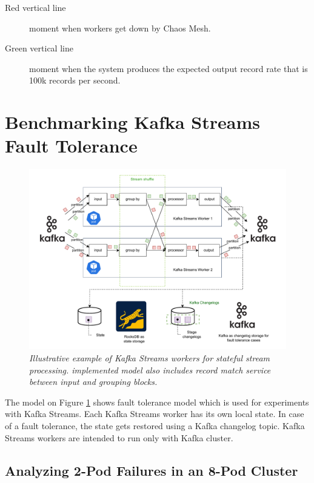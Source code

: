 \begin{description}
    \item[Red vertical line] moment when workers get down by Chaos Mesh.
    \item[Green vertical line] moment when the system produces the expected output record rate that is
    100k records per second.
\end{description}


\section{Benchmarking Kafka Streams Fault Tolerance}\label{sec:benchmarking-kafka-streams-fault-tolerance}
\begin{figure}[H]
    \centering
    \includegraphics[width=1\textwidth]{figures/kafka/kafka-streams-workers}
    \caption{\textit{Illustrative example of Kafka Streams workers for stateful stream processing.
    implemented model also includes record match service between input and grouping blocks.}}
    \label{fig:kafka-streams-workers-general}
\end{figure}

The model on Figure \ref{fig:kafka-streams-workers-general} shows fault tolerance model which is used for
experiments with Kafka Streams.
Each Kafka Streams worker has its own local state.
In case of a fault tolerance, the state gets restored using a Kafka changelog topic.
Kafka Streams workers are intended to run only with Kafka cluster.

\newpage
\subsection{Analyzing 2-Pod Failures in an 8-Pod Cluster}\label{subsec:analyzing-2-pod-failures-in-an-8-pod-cluster}

